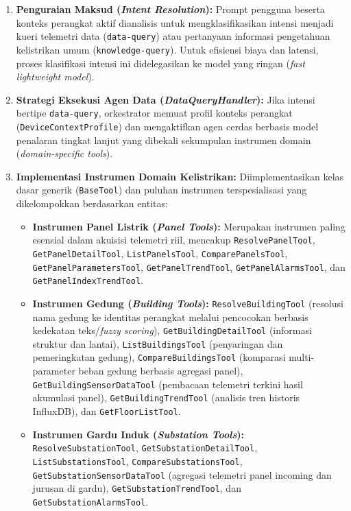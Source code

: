 \begin{enumerate}[label=\arabic*., leftmargin=*, itemsep=0pt]
  \item \textbf{Penguraian Maksud (\textit{Intent Resolution}):} Prompt pengguna beserta konteks perangkat aktif dianalisis untuk mengklasifikasikan intensi menjadi kueri telemetri data (\texttt{data-query}) atau pertanyaan informasi pengetahuan kelistrikan umum (\texttt{knowledge-query}). Untuk efisiensi biaya dan latensi, proses klasifikasi intensi ini didelegasikan ke model yang ringan (\textit{fast lightweight model}).
  \item \textbf{Strategi Eksekusi Agen Data (\textit{DataQueryHandler}):} Jika intensi bertipe \texttt{data-query}, orkestrator memuat profil konteks perangkat (\texttt{DeviceContextProfile}) dan mengaktifkan agen cerdas berbasis model penalaran tingkat lanjut yang dibekali sekumpulan instrumen domain (\textit{domain-specific tools}).
  \item \textbf{Implementasi Instrumen Domain Kelistrikan:} Diimplementasikan kelas dasar generik (\texttt{BaseTool}) dan puluhan instrumen terspesialisasi yang dikelompokkan berdasarkan entitas:
  \begin{itemize}[leftmargin=*, itemsep=0pt]
    \item \textbf{Instrumen Panel Listrik (\textit{Panel Tools}):} Merupakan instrumen paling esensial dalam akuisisi telemetri riil, mencakup \texttt{ResolvePanelTool}, \texttt{GetPanelDetailTool}, \texttt{ListPanelsTool}, \texttt{ComparePanelsTool}, \texttt{GetPanelParametersTool}, \texttt{GetPanelTrendTool}, \texttt{GetPanelAlarmsTool}, dan \texttt{GetPanelIndexTrendTool}.
    \item \textbf{Instrumen Gedung (\textit{Building Tools}):} \texttt{ResolveBuildingTool} (resolusi nama gedung ke identitas perangkat melalui pencocokan berbasis kedekatan teks/\textit{fuzzy scoring}), \texttt{GetBuildingDetailTool} (informasi struktur dan lantai), \texttt{ListBuildingsTool} (penyaringan dan pemeringkatan gedung), \texttt{CompareBuildingsTool} (komparasi multi-parameter beban gedung berbasis agregasi panel), \texttt{GetBuildingSensorDataTool} (pembacaan telemetri terkini hasil akumulasi panel), \texttt{GetBuildingTrendTool} (analisis tren historis InfluxDB), dan \texttt{GetFloorListTool}.
    \item \textbf{Instrumen Gardu Induk (\textit{Substation Tools}):} \texttt{ResolveSubstationTool}, \texttt{GetSubstationDetailTool}, \texttt{ListSubstationsTool}, \texttt{CompareSubstationsTool}, \texttt{GetSubstationSensorDataTool} (agregasi telemetri panel incoming dan jurusan di gardu), \texttt{GetSubstationTrendTool}, dan \texttt{GetSubstationAlarmsTool}.

\end{itemize}
\end{enumerate}
